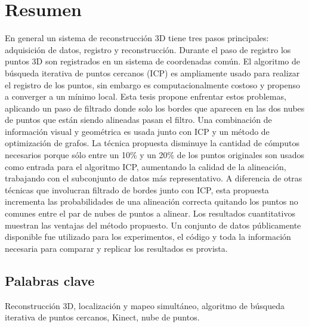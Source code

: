 
\chapter*{Resumen}

En general un sistema de reconstrucci\'on 3D tiene tres pasos principales: adquisici\'on de datos, registro y reconstrucci\'on. Durante el paso de registro los puntos 3D son registrados en un sistema de coordenadas com\'un. El algoritmo de b\'usqueda iterativa de puntos cercanos (ICP) es 
ampliamente usado para realizar el registro de los puntos, sin embargo es computacionalmente costoso y propenso a converger a un m\'inimo local. Esta tesis propone enfrentar estos problemas, aplicando un paso de filtrado donde solo los bordes que aparecen en las dos nubes de puntos 
que est\'an siendo alineadas pasan el filtro. Una combinaci\'on de informaci\'on visual y geom\'etrica es 
usada junto con ICP y un m\'etodo de optimizaci\'on de grafos. 
La t\'ecnica propuesta 
disminuye la cantidad de c\'omputos necesarios porque s\'olo entre un 10\% y un 20\% de los puntos originales son usados 
como entrada para el algoritmo ICP, 
aumentando la calidad de la alineaci\'on, trabajando con el subconjunto de datos m\'as representativo. A diferencia de otras 
t\'ecnicas que involucran filtrado de bordes junto con ICP, esta propuesta incrementa las probabilidades de una alineaci\'on 
correcta quitando los puntos no comunes entre el par de nubes de puntos a alinear. Los resultados cuantitativos muestran 
las ventajas del m\'etodo propuesto. Un conjunto de datos p\'ublicamente disponible fue utilizado para los experimentos, el c\'odigo 
y toda la informaci\'on necesaria para comparar y replicar los resultados es provista.


\section*{Palabras clave}


Reconstrucci\'on 3D, localizaci\'on y mapeo simult\'aneo, algoritmo de b\'usqueda iterativa de puntos cercanos, Kinect, nube de puntos.
